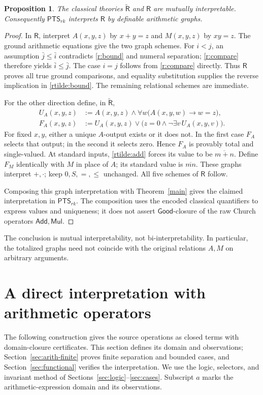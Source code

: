 \documentclass[11pt,a4paper]{article}
\newcommand{\PTS}{\mathsf{PTS}_{rk}}
\newcommand{\Rt}{\widetilde{\mathsf R}}
\newcommand{\R}{\mathsf R}
\newcommand{\Good}{\mathsf{Good}}
\newcommand{\Add}{\mathsf{Add}}
\newcommand{\Mul}{\mathsf{Mul}}
\newtheorem{proposition}[lemma]{Proposition}
\theoremstyle{remark}\newtheorem*{remark}{Remark}
\begin{document}
\begin{proposition}\label{prop:graphs}
The classical theories $\Rt$ and $\R$ are mutually interpretable.
Consequently $\PTS$ interprets $\R$ by definable arithmetic graphs.
\end{proposition}
\begin{proof}
In $\R$, interpret $A(x,y,z)$ by $x+y=z$ and $M(x,y,z)$ by $xy=z$.
The ground arithmetic equations give the two graph schemes.
For $i<j$, an assumption $\bar j\le\bar i$ contradicts
\eqref{r:bound} and numeral separation; \eqref{r:compare} therefore yields
$\bar i\le\bar j$. The case $i=j$ follows from \eqref{r:compare} directly.
Thus $\R$ proves all true ground comparisons, and equality substitution
supplies the reverse implication in \eqref{rtilde:bound}.
The remaining relational schemes are immediate.

For the other direction define, in $\Rt$,
\begin{align*}
 U_A(x,y,z)&:=A(x,y,z)\land
                \forall w\bigl(A(x,y,w)\to w=z\bigr),\\
 F_A(x,y,z)&:=U_A(x,y,z)\lor
       \bigl(z=0\land\neg\exists v\,U_A(x,y,v)\bigr).
\end{align*}
For fixed $x,y$, either a unique $A$-output exists or it does not. In the
first case $F_A$ selects that output; in the second it selects zero.
Hence $F_A$ is provably total and single-valued. At standard inputs,
\eqref{rtilde:add} forces its value to be $\overline{m+n}$.
Define $F_M$ identically with $M$ in place of $A$; its standard value is
$\overline{mn}$. These graphs interpret $+,\cdot$; keep $0,S,=,\le$
unchanged. All five schemes of $\R$ follow.

Composing this graph interpretation with Theorem~\ref{main} gives the
claimed interpretation in $\PTS$. The composition uses the encoded
classical quantifiers to express values and uniqueness; it does not
assert $\Good$-closure of the raw Church operators $\Add,\Mul$.
\end{proof}
The conclusion is mutual interpretability, not bi-interpretability.
In particular, the totalized graphs need not coincide with the original
relations $A,M$ on arbitrary arguments.


\section{A direct interpretation with arithmetic operators}\label{sec:operators}
The following construction gives the source operations as closed terms
with domain-closure certificates. This section defines its domain and
observations; Section~\ref{sec:arith-finite} proves finite separation and
bounded cases, and Section~\ref{sec:functional} verifies the interpretation.
We use the logic, selectors, and invariant method of
Sections~\ref{sec:logic}--\ref{sec:cases}. Subscript $a$ marks the
arithmetic-expression domain and its observations.
\end{document}
